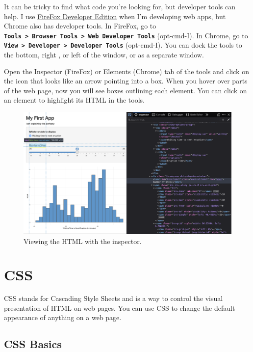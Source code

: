 \documentclass[
  oneside]{book}
\begin{document}
It can be tricky to find what code you're looking for, but developer tools can help. I use \href{https://www.mozilla.org/en-US/firefox/developer/}{FireFox Developer Edition} when I'm developing web apps, but Chrome also has developer tools. In FireFox, go to \textbf{\texttt{Tools\ \textgreater{}\ Browser\ Tools\ \textgreater{}\ Web\ Developer\ Tools}} (opt-cmd-I). In Chrome, go to \textbf{\texttt{View\ \textgreater{}\ Developer\ \textgreater{}\ Developer\ Tools}} (opt-cmd-I). You can dock the tools to the bottom, right , or left of the window, or as a separate window.

Open the Inspector (FireFox) or Elements (Chrome) tab of the tools and click on the icon that looks like an arrow pointing into a box. When you hover over parts of the web page, now you will see boxes outlining each element. You can click on an element to highlight its HTML in the tools.

\begin{figure}

{\centering \includegraphics[width=1\linewidth]{images/inspector} 

}

\caption{Viewing the HTML with the inspector.}\label{fig:inspector}
\end{figure}

\hypertarget{CSS}{%
\section{CSS}\label{CSS}}

CSS stands for Cascading Style Sheets and is a way to control the visual presentation of HTML on web pages. You can use CSS to change the default appearance of anything on a web page.

\hypertarget{css-basics}{%
\subsection{CSS Basics}\label{css-basics}}
\end{document}
